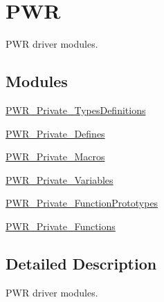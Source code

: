 \hypertarget{group___p_w_r}{\section{P\-W\-R}
\label{group___p_w_r}
}


P\-W\-R driver modules.  


\subsection*{Modules}
\begin{DoxyCompactItemize}
\item 
\hyperlink{group___p_w_r___private___types_definitions}{P\-W\-R\-\_\-\-Private\-\_\-\-Types\-Definitions}
\item 
\hyperlink{group___p_w_r___private___defines}{P\-W\-R\-\_\-\-Private\-\_\-\-Defines}
\item 
\hyperlink{group___p_w_r___private___macros}{P\-W\-R\-\_\-\-Private\-\_\-\-Macros}
\item 
\hyperlink{group___p_w_r___private___variables}{P\-W\-R\-\_\-\-Private\-\_\-\-Variables}
\item 
\hyperlink{group___p_w_r___private___function_prototypes}{P\-W\-R\-\_\-\-Private\-\_\-\-Function\-Prototypes}
\item 
\hyperlink{group___p_w_r___private___functions}{P\-W\-R\-\_\-\-Private\-\_\-\-Functions}
\end{DoxyCompactItemize}


\subsection{Detailed Description}
P\-W\-R driver modules. 